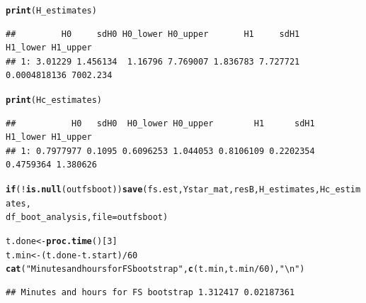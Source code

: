 \documentclass[9pt]{article}\usepackage[]{graphicx}\usepackage[]{xcolor}
\makeatletter
\newcommand{\hlnum}[1]{\textcolor[rgb]{0.686,0.059,0.569}{#1}}%
\newcommand{\hlstr}[1]{\textcolor[rgb]{0.192,0.494,0.8}{#1}}%
\newcommand{\hlopt}[1]{\textcolor[rgb]{0,0,0}{#1}}%
\newcommand{\hlstd}[1]{\textcolor[rgb]{0.345,0.345,0.345}{#1}}%
\newcommand{\hlkwa}[1]{\textcolor[rgb]{0.161,0.373,0.58}{\textbf{#1}}}%
\newcommand{\hlkwb}[1]{\textcolor[rgb]{0.69,0.353,0.396}{#1}}%
\newcommand{\hlkwc}[1]{\textcolor[rgb]{0.333,0.667,0.333}{#1}}%
\newcommand{\hlkwd}[1]{\textcolor[rgb]{0.737,0.353,0.396}{\textbf{#1}}}%
\newenvironment{kframe}{%
 \def\at@end@of@kframe{}%
 \ifinner\ifhmode%
  \def\at@end@of@kframe{\end{minipage}}%
  \begin{minipage}{\columnwidth}%
 \fi\fi%
 \def\FrameCommand##1{\hskip\@totalleftmargin \hskip-\fboxsep
 \colorbox{shadecolor}{##1}\hskip-\fboxsep
     \hskip-\linewidth \hskip-\@totalleftmargin \hskip\columnwidth}%
 \MakeFramed {\advance\hsize-\width
   \@totalleftmargin\z@ \linewidth\hsize
   \@setminipage}}%
 {\par\unskip\endMakeFramed%
 \at@end@of@kframe}
\newenvironment{knitrout}{}{} %
\theoremstyle{definition}
\theoremstyle{remark}
\makeatother
\begin{document}
\begin{knitrout}
\begin{kframe}
\begin{alltt}
\hlkwd{print}\hlstd{(H_estimates)}
\end{alltt}
\begin{verbatim}
##         H0     sdH0 H0_lower H0_upper       H1     sdH1     H1_lower H1_upper
## 1: 3.01229 1.456134  1.16796 7.769007 1.836783 7.727721 0.0004818136 7002.234
\end{verbatim}
\begin{alltt}
\hlkwd{print}\hlstd{(Hc_estimates)}
\end{alltt}
\begin{verbatim}
##           H0   sdH0  H0_lower H0_upper        H1      sdH1  H1_lower H1_upper
## 1: 0.7977977 0.1095 0.6096253 1.044053 0.8106109 0.2202354 0.4759364 1.380626
\end{verbatim}
\begin{alltt}
\hlkwa{if} \hlstd{(}\hlopt{!}\hlkwd{is.null}\hlstd{(outfsboot))} \hlkwd{save}\hlstd{(fs.est, Ystar_mat, resB, H_estimates, Hc_estimates,}
    \hlstd{df_boot_analysis,} \hlkwc{file} \hlstd{= outfsboot)}
\end{alltt}
\end{kframe}
\end{knitrout}


\begin{knitrout}
\color{fgcolor}\begin{kframe}
\begin{alltt}
\hlstd{t.done} \hlkwb{<-} \hlkwd{proc.time}\hlstd{()[}\hlnum{3}\hlstd{]}
\hlstd{t.min} \hlkwb{<-} \hlstd{(t.done} \hlopt{-} \hlstd{t.start)}\hlopt{/}\hlnum{60}
\hlkwd{cat}\hlstd{(}\hlstr{"Minutes and hours for FS bootstrap"}\hlstd{,} \hlkwd{c}\hlstd{(t.min, t.min}\hlopt{/}\hlnum{60}\hlstd{),} \hlstr{"\textbackslash{}n"}\hlstd{)}
\end{alltt}
\begin{verbatim}
## Minutes and hours for FS bootstrap 1.312417 0.02187361
\end{verbatim}
\end{kframe}
\end{knitrout}
\end{document}
